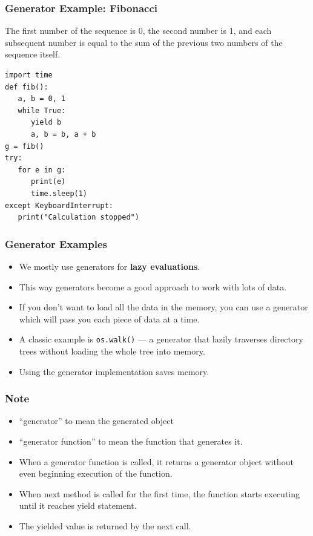 \begin{frame}[fragile]\frametitle{Generator Example: Fibonacci }
The first number of the sequence is 0, the second number is 1, and each subsequent number is equal to the sum of the previous two numbers of the sequence itself. 
\begin{lstlisting}
import time
def fib():
   a, b = 0, 1
   while True:
      yield b
      a, b = b, a + b
g = fib()
try:
   for e in g:
      print(e)
      time.sleep(1)
except KeyboardInterrupt:
   print("Calculation stopped")
\end{lstlisting}
\end{frame}


\begin{frame}[fragile]\frametitle{Generator Examples}
    \begin{itemize}
    \item  We mostly use generators for \textbf{lazy evaluations}.
    \item This way generators become a good approach to work with lots of data.
    \item If you don't want to load all the data in the memory, you can use a generator which will pass you each piece of data at a time.
\item A classic example is \lstinline|os.walk()| --- a generator that lazily traverses directory trees without loading the whole tree into memory.
\item Using the generator implementation saves memory.
    \end{itemize}
\end{frame}

\begin{frame}[fragile]\frametitle{Note}
    \begin{itemize}
    \item  ``generator'' to mean the generated object 
    \item ``generator function'' to mean the function that generates it.
    \item  When a generator function is called, it returns a generator object without even beginning execution of the function.
    \item When next method is called for the first time, the function starts executing until it reaches yield statement. 
    \item The yielded value is returned by the next call.
    \end{itemize}
\end{frame}

